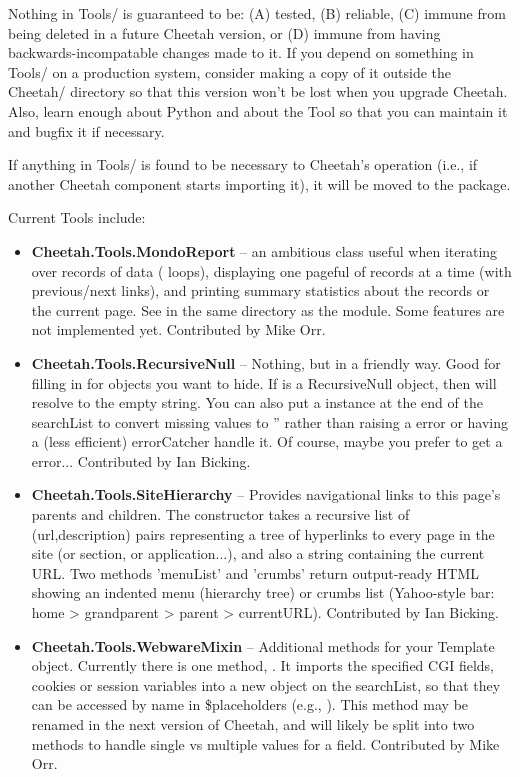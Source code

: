 Nothing in Tools/ is guaranteed to be: (A) tested, (B) reliable, (C) immune from
being deleted in a future Cheetah version, or (D) immune from having 
backwards-incompatable changes made to it.  If you depend on something in Tools/
on a production system, consider making a copy of it outside the Cheetah/
directory so that this version won't be lost when you upgrade Cheetah.  Also,
learn enough about Python and about the Tool so that you can maintain it and
bugfix it if necessary.

If anything in Tools/ is found to be necessary to Cheetah's operation (i.e., if
another Cheetah component starts importing it), it will be moved to the
 package.

Current Tools include:
\begin{itemize}
\item {\bf Cheetah.Tools.MondoReport} -- an ambitious class useful when iterating
     over records of data ( loops), displaying one pageful of records
     at a time (with previous/next links), and printing summary statistics about
     the records or the current page.  See  in the same
     directory as the module.  Some features are not implemented yet.  Contributed
     by Mike Orr.
\item {\bf Cheetah.Tools.RecursiveNull} -- Nothing, but in a friendly way.  Good
     for filling in for objects you want to hide.  If  is a
     RecursiveNull object, then 
     will resolve to the empty string.  You can also put a 
     instance at the end of the searchList to convert missing values to ''
     rather than raising a  error or having a (less efficient)
     errorCatcher handle it.  Of course, maybe you prefer to get a 
     error...  Contributed by Ian Bicking.
\item {\bf Cheetah.Tools.SiteHierarchy} -- Provides navigational links to this
     page's parents and children.  The constructor takes a recursive list of
     (url,description) pairs representing a tree of hyperlinks to every page in the
     site (or section, or application...), and also a string containing the current
     URL.  Two methods 'menuList' and 'crumbs' return output-ready HTML showing an
     indented menu (hierarchy tree) or crumbs list (Yahoo-style bar:
     home > grandparent > parent > currentURL).  Contributed by Ian Bicking.
\item{\bf Cheetah.Tools.WebwareMixin} -- Additional methods for your Template object.
     Currently there is one method, .  It imports the specified CGI
     fields, cookies or session variables into a new object on the searchList, so that
     they can be accessed by name in \$placeholders (e.g., ).  This
     method may be renamed in the next version of Cheetah, and will likely be split 
     into two methods to handle single vs multiple values for a field.  Contributed
     by Mike Orr.
\end{itemize}


